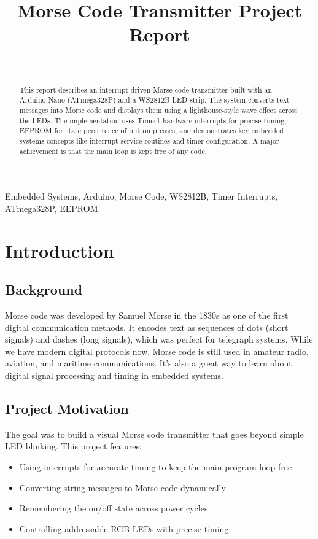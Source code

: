 \documentclass[report]{IEEEtran}
\title{Morse Code Transmitter Project Report}
\author{\IEEEauthorblockN{Jokobus} \\
\IEEEauthorblockA{\textit{Github} \\
\textit{Technical University of Github}\\
Somewhere, Around \\
}
}
\begin{document}
\maketitle

\begin{abstract}
This report describes an interrupt-driven Morse code transmitter built with an Arduino Nano (ATmega328P) and a WS2812B LED strip. 
The system converts text messages into Morse code and displays them using a lighthouse-style wave effect across the LEDs. 
The implementation uses Timer1 hardware interrupts for precise timing, EEPROM for state persistence of button presses, and demonstrates key embedded systems concepts like interrupt service routines and timer configuration. 
A major achievement is that the main loop is kept free of any code. 
\end{abstract}

\begin{IEEEkeywords}
Embedded Systems, Arduino, Morse Code, WS2812B, Timer Interrupts, ATmega328P, EEPROM
\end{IEEEkeywords}

\section{Introduction}

\subsection{Background}
Morse code was developed by Samuel Morse in the 1830s as one of the first digital communication methods. 
It encodes text as sequences of dots (short signals) and dashes (long signals), which was perfect for telegraph systems. 
While we have modern digital protocols now, Morse code is still used in amateur radio, aviation, and maritime communications. 
It's also a great way to learn about digital signal processing and timing in embedded systems.

\subsection{Project Motivation}
The goal was to build a visual Morse code transmitter that goes beyond simple LED blinking. This project features:
\begin{itemize}
    \item Using interrupts for accurate timing to keep the main program loop free
    \item Converting string messages to Morse code dynamically
    \item Remembering the on/off state across power cycles
    \item Controlling addressable RGB LEDs with precise timing
\end{itemize}
\end{document}
